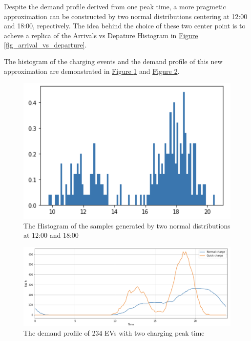 \documentclass[12pt,a4paper]{report}
\begin{document}
                Despite the demand profile derived from one peak time, a more pragmetic approximation can be constructed by two normal distributions centering at 12:00 and 18:00, repectively. The idea behind the choice of these two center point is to acheve a replica of the Arrivals vs Depature Histogram in \hyperref[fig_arrival_vs_departure]{Figure \ref*{fig_arrival_vs_departure}}.

                The histogram of the charging events and the demand profile of this new approximation are demonstrated in \hyperref[fig_two_peak_histogram]{Figure \ref*{fig_two_peak_histogram}} and \hyperref[fig_charging_demand_234_2]{Figure \ref*{fig_charging_demand_234_2}}.
                \begin{figure}[ht]
                    \centerline{\includegraphics[scale=1.5]{twoPeakHist}}
                    \caption{The Histogram of the samples generated by two normal distributions at 12:00 and 18:00}
                    \label{fig_two_peak_histogram}
                \end{figure}

                \begin{figure}[ht]
                    \centerline{\includegraphics[scale=1]{chargingEventsTwoPeak}}
                    \caption{The demand profile of 234 EVs with two charging peak time}
                    \label{fig_charging_demand_234_2}
                \end{figure}
\end{document}
